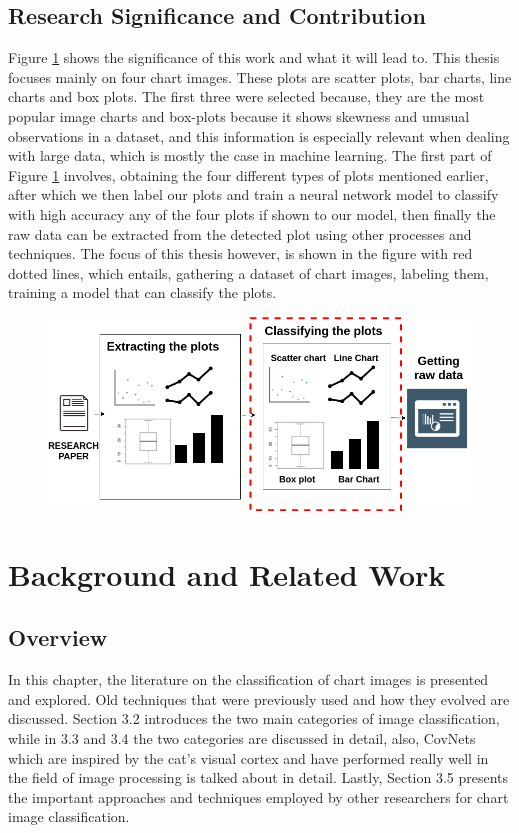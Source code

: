 \documentclass[12pt, a4paper,oneside]{report}
\begin{document}
\section{Research Significance and Contribution}
Figure \ref{fig:vis} shows the significance of this work and what it will lead to. This thesis focuses mainly on four chart images. These plots are scatter plots, bar charts, line charts and box plots. The first three were selected because, they are the most popular image charts and box-plots because it shows skewness and unusual observations in a dataset, and this information is especially relevant when dealing with large data, which is mostly the case in machine learning. The first part of Figure \ref{fig:vis} involves, obtaining  the four different types of plots mentioned earlier, after which we then label our plots and train a neural network model to classify with high accuracy any of the four plots if shown to our model, then finally the raw data can be extracted from the detected plot using other processes and techniques. The focus of this thesis however, is shown in the figure with red dotted lines, which entails, gathering a dataset of chart images, labeling them, training a model that can classify the plots. \\

\begin{figure}[!htb]
\includegraphics [scale=0.48] {vision}
\label{fig:vis}
\end{figure}


\chapter{Background and Related Work}
\section{Overview}
In this chapter, the literature on the classification of chart images is presented and explored. Old techniques that were previously used and how they evolved are discussed. Section 3.2 introduces the two main categories of image classification, while in 3.3 and 3.4 the two categories are discussed in detail, also, CovNets which are inspired by the cat’s visual cortex and have performed really well in the field of image processing is talked about in detail. Lastly, Section 3.5 presents the important approaches and techniques employed by other researchers for chart image classification.
\end{document}

